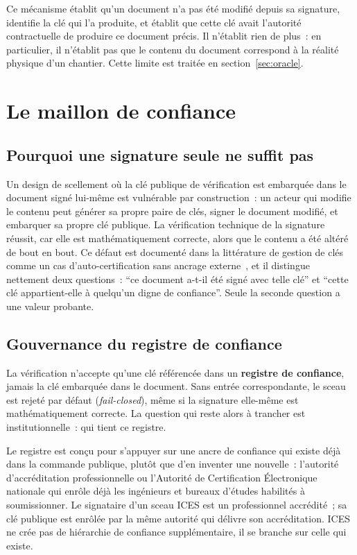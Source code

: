 \documentclass[11pt,a4paper]{article}
\begin{document}
Ce mécanisme établit qu'un document n'a pas été modifié depuis sa signature, identifie la clé qui l'a produite, et établit que cette clé avait l'autorité contractuelle de produire ce document précis. Il n'établit rien de plus~: en particulier, il n'établit pas que le contenu du document correspond à la réalité physique d'un chantier. Cette limite est traitée en section~\ref{sec:oracle}.

\section{Le maillon de confiance}\label{sec:confiance}

\subsection{Pourquoi une signature seule ne suffit pas}

Un design de scellement où la clé publique de vérification est embarquée dans le document signé lui-même est vulnérable par construction~: un acteur qui modifie le contenu peut générer sa propre paire de clés, signer le document modifié, et embarquer sa propre clé publique. La vérification technique de la signature réussit, car elle est mathématiquement correcte, alors que le contenu a été altéré de bout en bout. Ce défaut est documenté dans la littérature de gestion de clés comme un cas d'auto-certification sans ancrage externe~\cite{nist80057}, et il distingue nettement deux questions~: \enquote{ce document a-t-il été signé avec telle clé} et \enquote{cette clé appartient-elle à quelqu'un digne de confiance}. Seule la seconde question a une valeur probante.

\subsection{Gouvernance du registre de confiance}

La vérification n'accepte qu'une clé référencée dans un \textbf{registre de confiance}, jamais la clé embarquée dans le document. Sans entrée correspondante, le sceau est rejeté par défaut (\emph{fail-closed}), même si la signature elle-même est mathématiquement correcte. La question qui reste alors à trancher est institutionnelle~: qui tient ce registre.

Le registre est conçu pour s'appuyer sur une ancre de confiance qui existe déjà dans la commande publique, plutôt que d'en inventer une nouvelle~: l'autorité d'accréditation professionnelle ou l'Autorité de Certification Électronique nationale qui enrôle déjà les ingénieurs et bureaux d'études habilités à soumissionner. Le signataire d'un sceau ICES est un professionnel accrédité~; sa clé publique est enrôlée par la même autorité qui délivre son accréditation. ICES ne crée pas de hiérarchie de confiance supplémentaire, il se branche sur celle qui existe.
\end{document}
